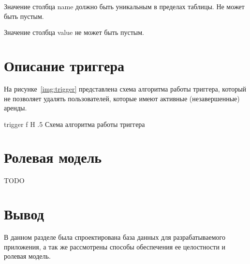 Значение столбца name должно быть уникальным в пределах таблицы. Не может быть пустым.

Значение столбца value не может быть пустым.

\section{Описание триггера}

На рисунке~\ref{img:trigger} представлена схема алгоритма работы триггера, который не позволяет удалять пользователей, которые имеют активные (незавершенные) аренды.

    {trigger}
    {f}
    {H}
    {.5\textwidth}
    {Схема алгоритма работы триггера}

\section{Ролевая модель}

TODO

\section*{Вывод}

В данном разделе была спроектирована база данных для разрабатываемого приложения, а так же рассмотрены способы обеспечения ее целостности и ролевая модель.